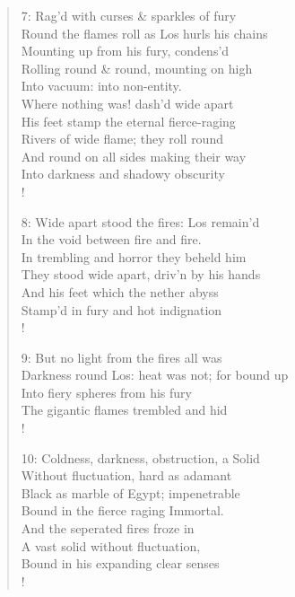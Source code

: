 \documentclass[9pt]{extarticle}
\begin{document}
\begin{verse}
\begin{altverse}
		7: Rag'd with curses \& sparkles of fury\\
		Round the flames roll as Los hurls his chains\\
		Mounting up from his fury, condens’d\\
		Rolling round \& round, mounting on high\\
		Into vacuum: into non-entity.\\
		Where nothing was! dash'd wide apart\\
		His feet stamp the eternal fierce-raging\\
		Rivers of wide flame; they roll round\\
		And round on all sides making their way\\
		Into darkness and shadowy obscurity\\!
		
		8: Wide apart stood the fires: Los remain’d\\
		In the void between fire and fire.\\
		In trembling and horror they beheld him\\
		They stood wide apart, driv’n by his hands\\
		And his feet which the nether abyss\\
		Stamp’d in fury and hot indignation\\!
		
		9: But no light from the fires all was\\
		Darkness round Los: heat was not; for bound up\\
		Into fiery spheres from his fury\\
		The gigantic flames trembled and hid\\!
		
		10: Coldness, darkness, obstruction, a Solid\\
		Without fluctuation, hard as adamant\\
		Black as marble of Egypt; impenetrable\\
		Bound in the fierce raging Immortal.\\
		And the seperated fires froze in\\
		A vast solid without fluctuation,\\
		Bound in his expanding clear senses\\!
		
\end{altverse}
\end{verse}	
\end{document}
